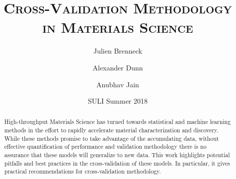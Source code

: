 \documentclass[onecolumn,abstract,paper=letter]{scrartcl}
\title{\textsc{\textmd{Cross-Validation Methodology \\ in Materials Science}}}
\author[1]{Julien Brenneck}
\author[2]{Alexander Dunn}
\author[2]{Anubhav Jain}
\affil[1]{University of Massachusetts Amherst}
\affil[2]{Lawrence Berkeley National Laboratory}
\date{SULI Summer 2018}
\begin{document}
\maketitle



\begin{abstract}

High-throughput Materials Science has turned towards statistical and machine learning methods in the effort to rapidly accelerate material characterization and discovery.
While these methods promise to take advantage of the accumulating data, without effective quantification of performance and validation methodology there is no assurance that these models will generalize to new data.
This work highlights potential pitfalls and best practices in the cross-validation of these models.
In particular, it gives practical recommendations for cross-validation methodology.



\end{abstract}

\end{document}
